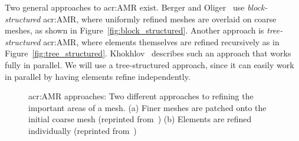 Two general approaches to \acrshort{acr:AMR} exist. Berger and Oliger~\cite{Berger1984} use
\textit{block-structured} \acrshort{acr:AMR}, where uniformly refined meshes are overlaid on coarse
meshes, as shown in Figure~\ref{fig:block_structured}. Another approach is \textit{tree-structured}
\acrshort{acr:AMR}, where elements themselves are refined recursively as in
Figure~\ref{fig:tree_structured}. Khokhlov~\cite{Khokhlov1998} describes such an approach that works
fully in parallel. We will use a tree-structured approach, since it can easily work in parallel by
having elements refine independently.

\begin{figure}[H]
	\centering
	\hfill
	\caption{\Acrlong{acr:AMR} approaches: Two different approaches to refining the important areas of a mesh. (a) Finer meshes are patched onto the initial coarse mesh (reprinted from~\cite{Berger1984}) (b) Elements are refined individually (reprinted from~\cite{Khokhlov1998})}\label{fig:amr_structures}
\end{figure}

